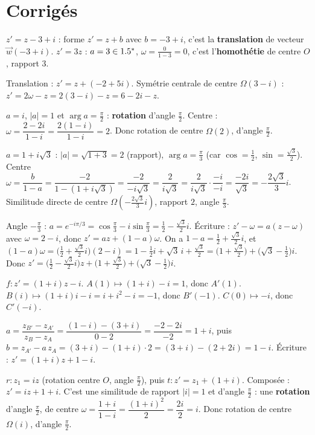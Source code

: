 \section{Corrigés}

$z'=z-3+i$ : forme $z'=z+b$ avec $b=-3+i$, c'est la \textbf{translation} de vecteur $\vec w(-3+i)$.\;
$z'=3z$ : $a=3\in1.5^{*}$, $\omega=\frac{0}{1-3}=0$, c'est l'\textbf{homothétie} de centre $O$, rapport $3$.

Translation : $z'=z+(-2+5i)$.\;
Symétrie centrale de centre $\Omega(3-i)$ : $z'=2\omega-z=2(3-i)-z=6-2i-z$.

$a=i$, $|a|=1$ et $\arg a=\frac\pi2$ : \textbf{rotation} d'angle $\frac\pi2$. Centre :
$\omega=\dfrac{2-2i}{1-i}=\dfrac{2(1-i)}{1-i}=2$. Donc rotation de centre $\Omega(2)$, d'angle $\frac\pi2$.

$a=1+i\sqrt3$ : $|a|=\sqrt{1+3}=2$ (rapport), $\arg a=\frac\pi3$ (car $\cos=\frac12$, $\sin=\frac{\sqrt3}2$).
Centre $\omega=\dfrac{b}{1-a}=\dfrac{-2}{1-(1+i\sqrt3)}=\dfrac{-2}{-i\sqrt3}=\dfrac{2}{i\sqrt3}
=\dfrac{2}{i\sqrt3}\cdot\dfrac{-i}{-i}=\dfrac{-2i}{\sqrt3}=-\dfrac{2\sqrt3}{3}i$.
Similitude directe de centre $\Omega\!\left(-\frac{2\sqrt3}{3}i\right)$, rapport $2$, angle $\frac\pi3$.

Angle $-\frac\pi3$ : $a=e^{-i\pi/3}=\cos\frac\pi3-i\sin\frac\pi3=\frac12-\frac{\sqrt3}2 i$.
Écriture : $z'-\omega=a(z-\omega)$ avec $\omega=2-i$, donc
$z'=a z+(1-a)\omega$. On a $1-a=\frac12+\frac{\sqrt3}2 i$, et
$(1-a)\omega=\big(\tfrac12+\tfrac{\sqrt3}2 i\big)(2-i)=1-\tfrac12 i+\sqrt3\,i+\tfrac{\sqrt3}2
=\big(1+\tfrac{\sqrt3}2\big)+\big(\sqrt3-\tfrac12\big)i$.
Donc $z'=\big(\tfrac12-\tfrac{\sqrt3}2 i\big)z+\big(1+\tfrac{\sqrt3}2\big)+\big(\sqrt3-\tfrac12\big)i$.

$f:z'=(1+i)z-i$.\;
$A(1)\mapsto (1+i)-i=1$, donc $A'(1)$.\;
$B(i)\mapsto (1+i)i-i=i+i^2-i=-1$, donc $B'(-1)$.\;
$C(0)\mapsto -i$, donc $C'(-i)$.

$a=\dfrac{z_{B'}-z_{A'}}{z_B-z_A}=\dfrac{(1-i)-(3+i)}{0-2}=\dfrac{-2-2i}{-2}=1+i$, puis
$b=z_{A'}-a\,z_A=(3+i)-(1+i)\cdot2=(3+i)-(2+2i)=1-i$. Écriture : $z'=(1+i)z+1-i$.

$r:z_1=iz$ (rotation centre $O$, angle $\frac\pi2$), puis $t:z'=z_1+(1+i)$. Composée :
$z'=iz+1+i$. C'est une similitude de rapport $|i|=1$ et d'angle $\frac\pi2$ : une \textbf{rotation}
d'angle $\frac\pi2$, de centre $\omega=\dfrac{1+i}{1-i}=\dfrac{(1+i)^2}{2}=\dfrac{2i}{2}=i$. Donc
rotation de centre $\Omega(i)$, d'angle $\frac\pi2$.

